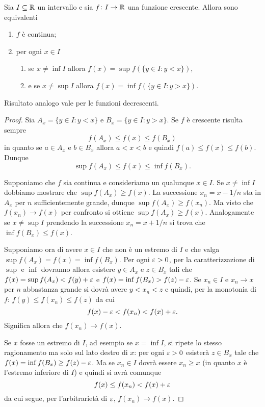 \begin{lemma}
Sia $I\subseteq\mathbb R$ un intervallo e sia $f\colon I \to \mathbb R$ una
funzione crescente. Allora sono equivalenti
\begin{enumerate}
\item $f$ è continua;
\item per ogni $x\in I$
  \begin{enumerate}
    \item se $x\neq \inf I$ allora $f(x) = \sup f(\{y \in I\colon y<x\})$,
    \item e se $x\neq \sup I$ allora $f(x) = \inf f(\{y \in I \colon y>x\})$.
  \end{enumerate}
\end{enumerate}

Risultato analogo vale per le funzioni decrescenti.
\end{lemma}
%
\begin{proof}
Sia $A_x = \{y \in I\colon y<x \}$ e $B_x = \{y\in I \colon y>x\}$.
Se $f$ è crescente risulta sempre
\[
f(A_x) \le f(x) \le f(B_x)
\]
in quanto se $a\in A_x$ e $b\in B_x$ allora $a<x<b$ e quindi $f(a)\le f(x) \le f(b)$. Dunque
\[
\sup f(A_x) \le f(x) \le \inf f(B_x).
\]

Supponiamo che $f$ sia continua e consideriamo un
qualunque $x\in I$.
Se $x\neq \inf I$ dobbiamo mostrare che $\sup f(A_x)\ge f(x)$.
La successione $x_n = x - 1/n$ sta in $A_x$ per $n$
sufficientemente grande, dunque $\sup f(A_x) \ge f(x_n)$.
Ma visto che $f(x_n)\to f(x)$ per confronto si ottiene $\sup f(A_x) \ge f(x)$.
Analogamente se $x\neq \sup I$ prendendo la successione $x_n = x+1/n$
si trova che $\inf f(B_x) \le f(x)$.

Supponiamo ora di avere $x\in I$ che non è un estremo di $I$ e che valga
$\sup f(A_x) = f(x) = \inf f(B_x)$.
Per ogni $\varepsilon>0$, per la caratterizzazione di $\sup$ e $\inf$
dovranno allora esistere $y\in A_x$ e $z\in B_x$ tali che
$f(x) = \sup f(A_x) < f(y) +\varepsilon$ e $f(x) = \inf f(B_x) > f(z)-\varepsilon$.
Se $x_n\in I$ e $x_n \to x$ per $n$ abbastanza grande si dovrà avere
$y < x_n < z$ e quindi, per la monotonia di $f$: $f(y)\le f(x_n)\le f(z)$
da cui
\[
  f(x)-\varepsilon < f(x_n) < f(x)+\varepsilon.
\]
Significa allora che $f(x_n)\to f(x)$.

Se $x$ fosse un estremo di $I$, ad esempio se $x=\inf I$, si ripete
lo stesso ragionamento ma solo sul lato destro di $x$: per ogni $\varepsilon>0$
esisterà $z\in B_x$ tale che $f(x) = \inf f(B_x) \ge f(z)-\varepsilon$.
Ma se $x_n\in I$ dovrà essere $x_n\ge x$ (in quanto $x$ è l'estremo inferiore
di $I$) e quindi si avrà comunque
\[
  f(x) \le f(x_n) < f(x) + \varepsilon
\]
da cui segue, per l'arbitrarietà di $\varepsilon$, $f(x_n)\to f(x)$.
\end{proof}

